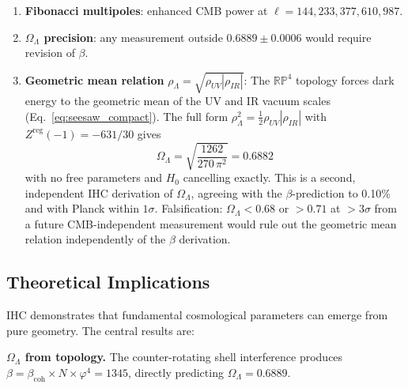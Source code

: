 \documentclass[12pt,a4paper]{article}
\begin{document}
\begin{enumerate}
  \item \textbf{Fibonacci multipoles}: enhanced CMB power at
        $\ell = 144, 233, 377, 610, 987$.

  \item \textbf{$\Omega_\Lambda$ precision}: any measurement outside
        $0.6889 \pm 0.0006$ would require revision of $\beta$.

  \item \textbf{Geometric mean relation} $\rho_\Lambda = \sqrt{\rho_{UV}|\rho_{IR}|}$:
        The $\mathbb{RP}^4$ topology forces dark energy to the geometric mean of the
        UV and IR vacuum scales (Eq.~\ref{eq:seesaw_compact}).
        The full form $\rho_\Lambda^2 = \tfrac{1}{2}\rho_{UV}|\rho_{IR}|$
        with $Z^\mathrm{reg}(-1) = -631/30$ gives
        \begin{equation}
          \Omega_\Lambda = \sqrt{\frac{1262}{270\,\pi^2}} = 0.6882
        \end{equation}
        with no free parameters and $H_0$ cancelling exactly.
        This is a second, independent IHC derivation of $\Omega_\Lambda$,
        agreeing with the $\beta$-prediction to 0.10\% and with Planck within
        $1\sigma$.  Falsification: $\Omega_\Lambda < 0.68$ or $> 0.71$ at
        $>3\sigma$ from a future CMB-independent measurement would rule out the
        geometric mean relation independently of the $\beta$ derivation.
\end{enumerate}

\subsection{Theoretical Implications}

IHC demonstrates that fundamental cosmological parameters can emerge from pure
geometry. The central results are:

\textbf{$\Omega_\Lambda$ from topology.} The counter-rotating shell interference
produces $\beta = \beta_\mathrm{coh} \times N \times \varphi^4 = 1345$, directly
predicting $\Omega_\Lambda = 0.6889$.
\end{document}
